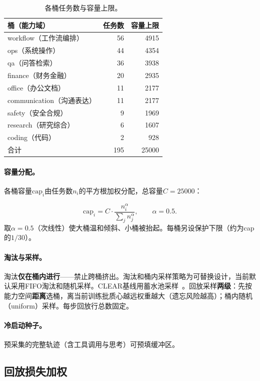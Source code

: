 \begin{table}[t]
\centering
\caption{各桶任务数与容量上限。}
\label{tab:buckets}
\begin{tabular}{lrr}
\toprule
桶（能力域） & 任务数 & 容量上限 \\
\midrule
workflow（工作流编排） & 56 & 4915 \\
ops（系统操作） & 44 & 4354 \\
qa（问答检索） & 36 & 3938 \\
finance（财务金融） & 20 & 2935 \\
office（办公文档） & 11 & 2177 \\
communication（沟通表达） & 11 & 2177 \\
safety（安全合规） & 9 & 1969 \\
research（研究综合） & 6 & 1607 \\
coding（代码） & 2 & 928 \\
\midrule
合计 & 195 & 25000 \\
\bottomrule
\end{tabular}
\end{table}

\paragraph{容量分配。}各桶容量$\text{cap}_i$由任务数$n_i$的平方根加权分配，总容量$C=25000$：

\begin{equation}
  \text{cap}_i = C\cdot\frac{n_i^{\alpha}}{\sum_j n_j^{\alpha}},\qquad \alpha=0.5.
  \label{eq:quota}
\end{equation}
取$\alpha=0.5$（次线性）使大桶温和倾斜、小桶被抬起。每桶另设保护下限（约为cap的$1/30$）。

\paragraph{淘汰与采样。}淘汰\textbf{仅在桶内进行}——禁止跨桶挤出。淘汰和桶内采样策略为可替换设计，当前默认采用FIFO淘汰和随机采样。CLEAR基线用蓄水池采样~\cite{A2}。回放采样\textbf{两级}：先按能力空间\textbf{距离}选桶，离当前训练批质心越远权重越大（遗忘风险越高）；桶内随机（uniform）采样。每步回放行总数固定。

\paragraph{冷启动种子。}预采集的完整轨迹（含工具调用与思考）可预填缓冲区。

\subsection{回放损失加权}
\label{sec:replay-weight}

